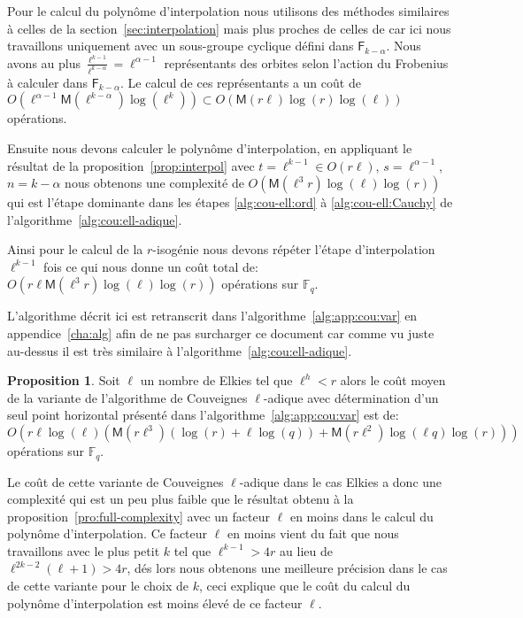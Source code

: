\documentclass[10pt,a4paper]{book}
\theoremstyle{plain}
\theoremstyle{definition}
\theoremstyle{definition}
\theoremstyle{definition}
\theoremstyle{definition}
\newtheorem{prop}[thm]{Proposition}
\theoremstyle{definition}
\theoremstyle{remark}
\theoremstyle{remark}
\theoremstyle{definition}
\begin{document}
Pour le calcul du polynôme d'interpolation nous utilisons des méthodes 
similaires à celles de la section~\ref{sec:interpolation} mais plus proches de  
celles de \cite[§5]{DeFeo11} car ici nous travaillons uniquement avec un sous-groupe 
cyclique défini dans $\mathsf{F}_{k-\alpha}$. 
Nous avons au plus $\frac{\ell^{k-1}}{\ell^{k-\alpha}}=\ell^{\alpha-1}$ représentants 
des orbites selon l'action du Frobenius à calculer dans $\mathsf{F}_{k-\alpha}$.
Le calcul de ces représentants a un coût de 
$O(\ell^{\alpha-1}\mathsf{M}(\ell^{k-\alpha})\log(\ell^k)) \subset O(\mathsf{M}(r\ell)\log(r)\log(\ell))$ opérations.

Ensuite nous devons calculer le polynôme d'interpolation, en appliquant le résultat
de la proposition~\ref{prop:interpol} avec $t=\ell^{k-1} \in O(r \ell)$, 
$s=\ell^{\alpha-1}$, $n=k-\alpha$ nous obtenons une complexité de 
$O(\mathsf{M}(\ell^3r)\log(\ell)\log(r))$ qui est l'étape dominante dans les
étapes \ref{alg:cou-ell:ord} à \ref{alg:cou-ell:Cauchy} de 
l'algorithme~\ref{alg:cou:ell-adique}.

Ainsi pour le calcul de la $r$-isogénie nous devons répéter l'étape d'interpolation 
$\ell^{k-1}$ fois ce qui nous donne un coût total de: 
$O(r \ell \mathsf{M}(\ell^3r)\log(\ell)\log(r))$ opérations sur $\mathbb{F}_q$.

L'algorithme décrit ici est retranscrit dans l'algorithme~\ref{alg:app:cou:var}
en appendice~\ref{cha:alg} afin de ne pas surcharger ce document car comme vu 
juste au-dessus il est très similaire à l'algorithme~\ref{alg:cou:ell-adique}.

\begin{prop}
Soit $\ell$ un nombre de Elkies tel que $\ell^h<r$ alors le coût moyen de la 
variante de l'algorithme de Couveignes $\ell$-adique avec détermination d'un 
seul point horizontal présenté dans l'algorithme~\ref{alg:app:cou:var} 
est de: 
\[
O(r \ell \log(\ell) ( \mathsf{M}(r \ell^3) (\log(r) + \ell \log(q)) + \mathsf{M}(r \ell^2) \log(\ell q) \log(r) ) )
\]
opérations sur $\mathbb{F}_q$.
\end{prop}

Le coût de cette variante de Couveignes $\ell$-adique dans le cas Elkies a donc
une complexité qui est un peu plus faible que le résultat obtenu à la 
proposition~\ref{pro:full-complexity} avec un facteur $\ell$ en moins dans le 
calcul du polynôme d'interpolation. Ce facteur $\ell$ en moins vient du fait 
que nous travaillons avec le plus petit $k$ tel que $\ell^{k-1} >4r$ au lieu de 
$\ell^{2k-2}(\ell+1)>4r$, dés lors nous obtenons une meilleure précision dans 
le cas de cette variante pour le 
choix de $k$, ceci explique que le coût du calcul du polynôme d'interpolation 
est moins élevé de ce facteur $\ell$. 
\end{document}
